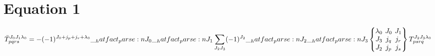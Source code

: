 \documentclass{scrartcl}
\newcommand{\ninej}[9]{\begingroup\setlength{\arraycolsep}{0.2em}\begin{Bmatrix} #1 & #2 & #3 \\ #4 & #5 & #6 \\ #7 & #8 & #9 \end{Bmatrix}\endgroup}
\begin{document}
\section{Equation 1}
\begin{dmath*}
\bar{T}_{p q r s}^{{J}_{0} {J}_{1} {{\lambda}}_{0}} = -(-1)^{{J}_{0}+{j}_{p}+{j}_{r}+{{\lambda}}_{0}} \* \hatfact{{J}_{0}} \* \hatfact{{J}_{1}} \* \sum_{{J}_{2} {J}_{3}} \* (-1)^{{J}_{2}} \* \hatfact{{J}_{2}} \* \hatfact{{J}_{3}} \* \ninej{{{\lambda}}_{0}}{{J}_{0}}{{J}_{1}}{{J}_{3}}{{j}_{q}}{{j}_{r}}{{J}_{2}}{{j}_{p}}{{j}_{s}} \* T_{p s r q}^{{J}_{2} {J}_{3} {{\lambda}}_{0}}
\end{dmath*}
\end{document}
